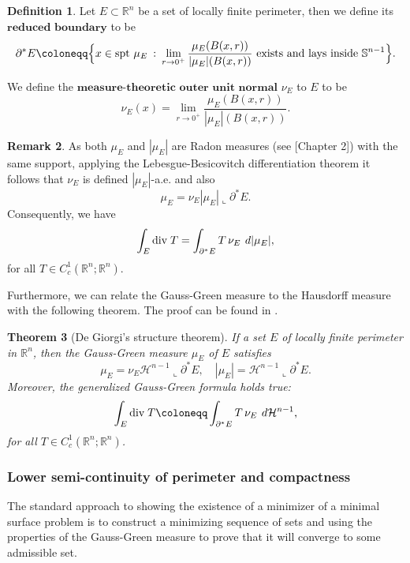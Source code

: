 \documentclass[artcle, 11pt, reqno]{amsart}
\numberwithin{equation}{section}
\newcommand{\R}{\mathbb{R}}
\newcommand{\Hd}{\mathcal{H}}
\newcommand{\dd}{\: d}
\newcommand{\divv}{\textnormal{div} \;}
\theoremstyle{plain}
\newtheorem{theorem}{Theorem}
\theoremstyle{definition}
\newtheorem{definition}[theorem]{Definition}
\newtheorem{remark}[theorem]{Remark}
\theoremstyle{remark}
\begin{document}
	\begin{definition} \label{def:reducedbdry}
		Let $E \subset \R^n$ be a set of locally finite perimeter, then we define its \\ $\textbf{reduced boundary}$ to be 
		\[
		\partial^\ast E \coloneqq \Bigl\{x \in \textnormal{spt } \mu_E \: : \: 
		\lim_{r \rightarrow0^+} \frac{\mu_E(B(x,r))}{|\mu_E|(B(x,r))} \textnormal{ exists and lays inside } \mathbb{S}^{n-1} \Bigr\}.
		\]
	\end{definition}
	We define the $\textbf{measure-theoretic outer unit normal}$ $\nu_E$ to $E$ to be 
	\[
	\nu_E(x) = \lim_{r \rightarrow0^+} \frac{\mu_E(B(x,r))}{|\mu_E|(B(x,r))}. 
	\]
	
	\begin{remark}
		As both $\mu_E$ and $|\mu_E|$ are Radon measures (see [Chapter 2]\cite{maggi2012sets}) with the same support, applying the Lebesgue-Besicovitch differentiation theorem \cite[Theorem 5.8]{maggi2012sets} it follows that $\nu_E$ is defined $|\mu_E|$-a.e. and also
		\[
		\mu_E = \nu_E |\mu_E|\llcorner \partial^\ast E.
		\] 
		Consequently, we have
		\begin{equation} \label{eq:GeneralizedDivThm}
			\int_E \divv T = \int_{\partial^\ast E} T \, \nu_E \, \dd|\mu_E|,
		\end{equation}
		for all $T \in C^1_c(\R^n;\R^n)$.
	\end{remark}
	Furthermore, we can relate the Gauss-Green measure to the Hausdorff measure with the following theorem. The proof can be found in \cite[Theorem 15.9]{maggi2012sets}.
	
	\begin{theorem}[De Giorgi's structure theorem] \label{thm:Giorgo}
		If a set $E$ of locally finite perimeter in $\R^n$, then the Gauss-Green measure $\mu_E$ of $E$ satisfies
		\[
		\mu_E = \nu_E \Hd^{n-1} \llcorner \partial^\ast E, \quad |\mu_E| = \Hd^{n-1} \llcorner \partial^\ast E.
		\]
		Moreover, the generalized Gauss-Green formula holds true:
		\[
		\int_E \divv T \coloneqq \int_{\partial^\ast E} T \, \nu_E \, \dd \Hd^{n-1},
		\]
		for all $T \in C^1_c(\R^n;\R^n)$.
	\end{theorem}
	
	
	
	\subsubsection{Lower semi-continuity of perimeter and compactness} \label{subsec:Lsc}
	The standard approach to showing the existence of a minimizer of a minimal surface problem is to construct a minimizing sequence of sets and using  the properties of the Gauss-Green measure to prove that it will converge to some admissible set. \\
	
\end{document}
